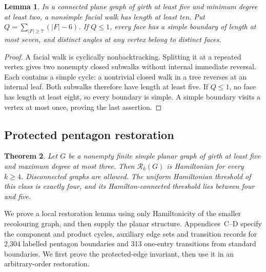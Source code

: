 \documentclass[11pt]{article}
\newtheorem{theorem}{Theorem}[section]
\newtheorem{lemma}[theorem]{Lemma}
\theoremstyle{remark}
\newcommand{\Rk}{\mathcal R_k}
\numberwithin{equation}{section}
\numberwithin{table}{section}
\begin{document}
\begin{lemma}\label{lem:short-facial-walks}
In a connected plane graph of girth at least five and minimum degree at
least two, a nonsimple facial walk has length at least ten. Put
$Q=\sum_{|F|\ge7}(|F|-6)$. If $Q\le1$, every face has a simple boundary of length at most seven, and distinct
angles at any vertex belong to distinct faces.
\end{lemma}
\begin{proof}
A facial walk is cyclically nonbacktracking. Splitting it at a repeated
vertex gives two nonempty closed subwalks without internal immediate
reversal. Each contains a simple cycle: a nontrivial closed walk in a tree
reverses at an internal leaf. Both subwalks therefore have length at least
five. If $Q\le1$, no face has length at least eight, so every boundary is
simple. A simple boundary visits a vertex at most once, proving the last
assertion.
\end{proof}

\subsection{Protected pentagon restoration}
\begin{theorem}\label{thm:subcubic}
Let $G$ be a nonempty finite simple planar graph of girth at least five
and maximum degree at most three. Then $\Rk(G)$ is Hamiltonian for
every $k\ge4$. Disconnected graphs are allowed. The uniform Hamiltonian threshold
of this class is exactly four, and its Hamilton-connected threshold lies
between four and five.
\end{theorem}

We prove a local restoration lemma using only Hamiltonicity of the
smaller recolouring graph, and then supply the planar structure.
Appendices~C--D specify the component and product cycles, auxiliary edge sets and
transition records for 2,304 labelled pentagon boundaries and 313
one-entry transitions from standard boundaries. We first prove the protected-edge
invariant, then use it in an arbitrary-order restoration.
\end{document}
